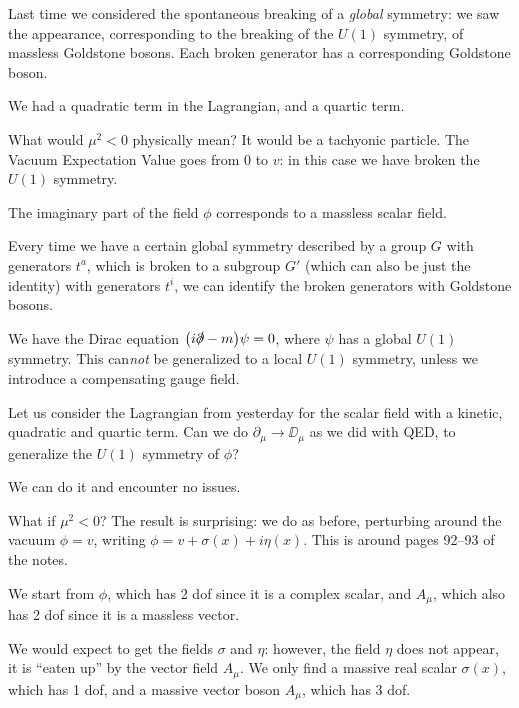 \documentclass[main.tex]{subfiles}
\begin{document}

Last time we considered the spontaneous breaking of a \emph{global} symmetry: we saw the appearance, corresponding to the breaking of the \(U(1)\) symmetry, of massless Goldstone bosons.
Each broken generator has a corresponding Goldstone boson.

We had a quadratic term in the Lagrangian, and a quartic term. 

What would \(\mu^2<0\) physically mean? It would be a tachyonic particle. The Vacuum Expectation Value goes from 0 to \(v\): in this case we have broken the \(U(1)\) symmetry.

The imaginary part of the field \(\phi \) corresponds to a massless scalar field.

Every time we have a certain global symmetry described by a group \(G\) with generators \(t^{a}\), which is broken to a subgroup \(G'\) (which can also be just the identity) with generators \(t^{i}\), we can identify the broken generators with Goldstone bosons.

We have the Dirac equation \(\qty(i \slashed{\partial} - m) \psi =0\), where \(\psi \) has a global \(U(1)\) symmetry. 
This can\emph{not} be generalized to a local \(U(1)\) symmetry, unless we introduce a compensating gauge field.

Let us consider the Lagrangian from yesterday for the scalar field with a kinetic, quadratic and quartic term. Can we do \(\partial_{\mu } \to \DD_{\mu }\) as we did with QED, to generalize the \(U(1)\) symmetry of \(\phi \)?

We can do it and encounter no issues. 

What if \(\mu^2<0\)? The result is surprising: we do as before, perturbing around the vacuum \(\phi = v\), writing \(\phi = v + \sigma (x) + i \eta (x)\). 
This is around pages 92--93 of the notes.

We start from \(\phi \), which has 2 dof since it is a complex scalar, and \(A_{\mu }\), which also has 2 dof since it is a massless vector. 

We would expect to get the fields \(\sigma \) and \(\eta \): however, the field \(\eta \) does not appear, it is ``eaten up'' by the vector field \(A_{\mu }\).
We only find a massive real scalar \(\sigma (x)\), which has 1 dof, and a massive vector boson \(A_{\mu }\), which has 3 dof.
\end{document}
